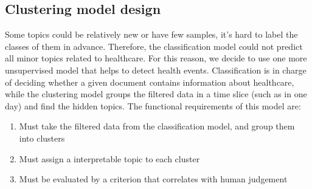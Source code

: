 \subsection{Clustering model design}
Some topics could be relatively new or have few samples, it's hard to label the classes of them in advance. Therefore, the classification model could not predict all minor topics related to healthcare. For this reason, we decide to use one more unsupervised model that helps to detect health events. Classification is in charge of deciding whether a given document contains information about healthcare, while the clustering model groups the filtered data in a time slice (such as in one day) and find the hidden topics. The functional requirements of this model are:
\begin{enumerate}
    \item Must take the filtered data from the classification model, and group them into clusters
    \item Must assign a interpretable topic to each cluster
    \item Must be evaluated by a criterion that correlates with human judgement
\end{enumerate}

